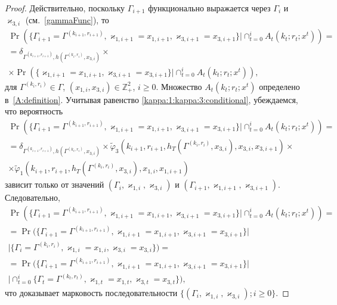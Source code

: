 \begin{proof}
Действительно,  поскольку $\Gamma_{i+1}$ функционально выражается через $\Gamma_i$ и $\varkappa_{3, i}$ (см.~\eqref{gammaFunc}),  то
\begin{multline*}
\Pr (\{ \Gamma_{i+1} =\Gamma^{(k_{i+1}, r_{i+1})}, \varkappa_{1, i+1} = x_{1, i+1}, \varkappa_{3, i+1} = x_{3, i+1}\} | \cap_{t=0}^{i} A_t(k_t;r_t;x^t))=\\
=\delta_{\Gamma^{(k_{i+1}, r_{i+1})}, h(\Gamma^{(k_i, r_i)}, x_{3, i})}\times\\
\times \Pr (\{ \varkappa_{1, i+1} = x_{1, i+1},   \varkappa_{3, i+1} = x_{3, i+1}\} |\cap_{t=0}^{i} A_t(k_t;r_t;x^t)), 
\end{multline*}
для $\Gamma^{(k_i, r_i)}\in \Gamma$,  $(x_{1, i},  x_{3, i})\in {\mathbb Z}_+^2$,  $i\geqslant 0$. Множество $A_t(k_t;r_t;x^t)$ определено в~\eqref{A:definition}. Учитывая равенство \eqref{kappa:1:kappa:3:conditional},  убеждаемся,  что вероятность 
\begin{multline*}
\Pr (\{ \Gamma_{i+1} =\Gamma^{(k_{i+1}, r_{i+1})}, \varkappa_{1, i+1} = x_{1, i+1}, \varkappa_{3, i+1} = x_{3, i+1}\} | \cap_{t=0}^{i}A_t(k_t;r_t;x^t)) = \\
=\delta_{\Gamma^{(k_{i+1}, r_{i+1})}, h(\Gamma^{(k_i, r_i)}, x_{3, i})} \times \widetilde{\varphi}_3(k_{i+1}, r_{i+1}, h_T(\Gamma^{(k_i, r_i)}, x_{3, i}), x_{3, i}, x_{3, i+1})
\times \\ \times \widetilde{\varphi}_1(k_{i+1}, r_{i+1}, h_T(\Gamma^{(k_i, r_i)}, x_{3, i}), x_{1, i}, x_{1, i+1})
\end{multline*}
зависит только от значений $(\Gamma_i, \varkappa_{1, i}, \varkappa_{3, i})$ и $(\Gamma_{i+1}, \varkappa_{1, i+1},  \varkappa_{3, i+1})$. Следовательно,  
\begin{multline*}
\Pr (\{ \Gamma_{i+1} =\Gamma^{(k_{i+1}, r_{i+1})}, \varkappa_{1, i+1} = x_{1, i+1}, \varkappa_{3, i+1} = x_{3, i+1}\} |\cap_{t=0}^{i}A_t(k_t;r_t;x^t))=\\
=\Pr (\{  \Gamma_{i+1} =\Gamma^{(k_{i+1}, r_{i+1})}, \varkappa_{1, i+1} = x_{1, i+1}, \varkappa_{3, i+1} = x_{3, i+1}\} | \\ | \{ \Gamma_i=\Gamma^{(k_i, r_i)}, \varkappa_{1, i}=x_{1, i},  \varkappa_{3, i}=x_{3, i}\}) = \\
=\Pr (\{ \Gamma_{i+1} =\Gamma^{(k_{i+1}, r_{i+1})},  \varkappa_{1, i+1} = x_{1, i+1}, \varkappa_{3, i+1} = x_{3, i+1}\} | \\ |\cap_{t=0}^{i}\{ \Gamma_t=\Gamma^{(k_t, r_t)},  \varkappa_{1, t}=x_{1, t},  \varkappa_{3, t}=x_{3, t}\}), 
\end{multline*}
что доказывает марковость последовательности $\{(\Gamma_i,  \varkappa_{1, i}, \varkappa_{3, i}); i \geqslant 0\}$.
\end{proof}
